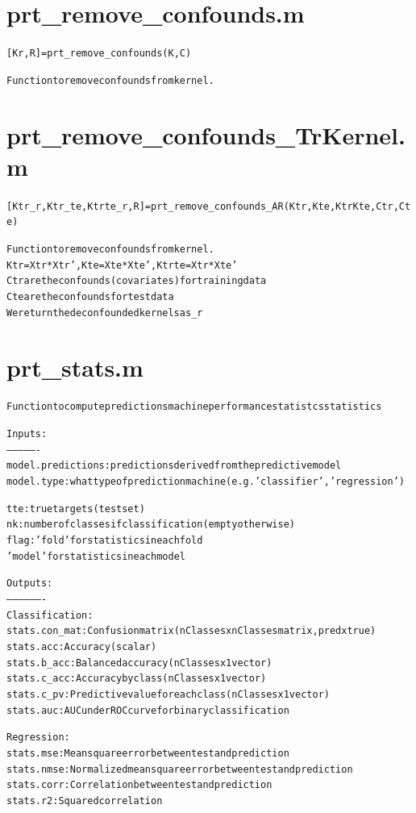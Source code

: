 \section{prt\_remove\_confounds.m}
\begin{alltt}

 [Kr, R] = prt\_remove\_confounds(K,C)
 
 Function to remove confounds from kernel.
\end{alltt}


\section{prt\_remove\_confounds\_TrKernel.m}
\begin{alltt}

 [Ktr\_r, Ktr\_te,Ktrte\_r,R] = prt\_remove\_confounds\_AR(Ktr,Kte,KtrKte,Ctr,Cte)
 
 Function to remove confounds from kernel.
 Ktr =Xtr*Xtr',Kte=Xte*Xte',Ktrte=Xtr*Xte'
 Ctr are the confounds (covariates) for training data
 Cte are the confounds for test data
 We return the deconfounded kernels as \_r

\end{alltt}


\section{prt\_stats.m}
\begin{alltt}

 Function to compute predictions machine performance statistcs statistics
 
 Inputs:
 ----------------
 model.predictions: predictions derived from the predictive model
 model.type:        what type of prediction machine (e.g. 'classifier','regression')
 
 tte: true targets (test set)
 nk:  number of classes if classification (empty otherwise)
 flag:  'fold' for statistics in each fold
         'model' for statistics in each model
 
 Outputs:
-------------------
 Classification:
 stats.con\_mat: Confusion matrix (nClasses x nClasses matrix, pred x true)
 stats.acc:     Accuracy (scalar)
 stats.b\_acc:   Balanced accuracy (nClasses x 1 vector)
 stats.c\_acc:   Accuracy by class (nClasses x 1 vector)
 stats.c\_pv:    Predictive value for each class (nClasses x 1 vector)
 stats.auc:     AUC under ROC curve for binary classification

 
 Regression:
 stats.mse:     Mean square error between test and prediction
 stats.nmse:    Normalized mean square error between test and prediction
 stats.corr:    Correlation between test and prediction
 stats.r2:      Squared correlation
\end{alltt}


